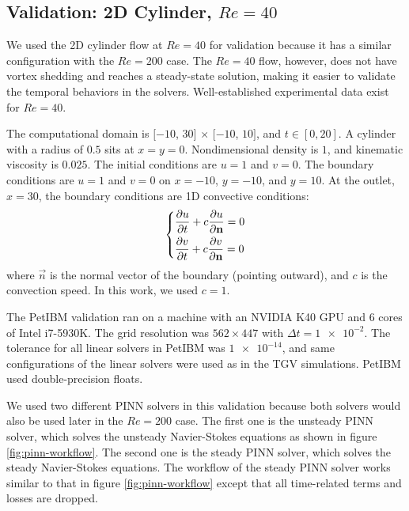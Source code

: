 
\subsection{Validation: 2D Cylinder, $Re=\num{40}$}\label{sec:val_2d_cylinder_re40}

We used the 2D cylinder flow at $Re=40$ for validation because it has a similar configuration with the $Re=200$ case.
The $Re=40$ flow, however, does not have vortex shedding and reaches a steady-state solution, making it easier to validate the temporal behaviors in the solvers.
Well-established experimental data exist for $Re=40$.

The computational domain is $[-10$, $30]$ $\times$ $[-10$, $10]$, and $t \in [0, 20]$.
A cylinder with a radius of $0.5$ sits at $x=y=0$.
Nondimensional density is $1$, and kinematic viscosity is $0.025$.
The initial conditions are $u=1$ and $v=0$.
The boundary conditions are $u=1$ and $v=0$ on $x=-10$, $y=-10$, and $y=10$.
At the outlet, $x=30$, the boundary conditions are 1D convective conditions:
\begin{equation}\label{eq:convec-bc}
    \left\{
    \begin{aligned}
        &\frac{\partial u}{\partial t} + c\frac{\partial u}{\partial \mathbf{n}} = 0 \\
        &\frac{\partial v}{\partial t} + c\frac{\partial v}{\partial \mathbf{n}} = 0 \\
    \end{aligned}
    \right.
\end{equation}
where $\vec{n}$ is the normal vector of the boundary (pointing outward), and $c$ is the convection speed.
In this work, we used $c=1$.

The PetIBM validation ran on a machine with an NVIDIA K40 GPU and 6 cores of Intel i7-5930K.
The grid resolution was $562 \times 447$ with $\Delta t=\num{1e-2}$.
The tolerance for all linear solvers in PetIBM was $\num{1e-14}$, and same configurations of the linear solvers were used as in the TGV simulations.
PetIBM used double-precision floats.

We used two different PINN solvers in this validation because both solvers would also be used later in the $Re=200$ case.
The first one is the unsteady PINN solver, which solves the unsteady Navier-Stokes equations as shown in figure \ref{fig:pinn-workflow}.
The second one is the steady PINN solver, which solves the steady Navier-Stokes equations.
The workflow of the steady PINN solver works similar to that in figure \ref{fig:pinn-workflow} except that all time-related terms and losses are dropped.

